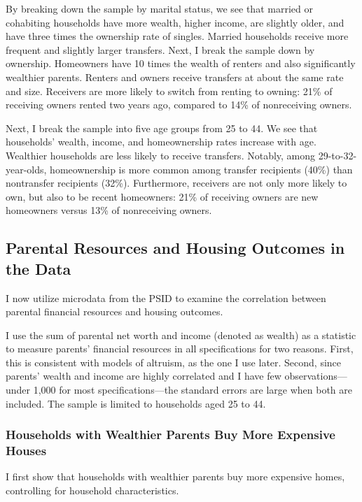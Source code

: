 \documentclass[12pt]{article}
\begin{document}
By breaking down the sample by marital status, we see that married or cohabiting households have more wealth, higher income, are slightly older, and have three times the ownership rate of singles. Married households receive more frequent and slightly larger transfers. Next, I break the sample down by ownership. Homeowners have 10 times the wealth of renters and also significantly wealthier parents. Renters and owners receive transfers at about the same rate and size. Receivers are more likely to switch from renting to owning: 21\% of receiving owners rented two years ago, compared to 14\% of nonreceiving owners.

Next, I break the sample into five age groups from 25 to 44. We see that households' wealth, income, and homeownership rates increase with age. Wealthier households are less likely to receive transfers. Notably, among 29-to-32-year-olds, homeownership is more common among transfer recipients (40\%) than nontransfer recipients (32\%). Furthermore, receivers are not only more likely to own, but also to be recent homeowners: 21\% of receiving owners are new homeowners versus 13\% of nonreceiving owners.



\subsection{Parental Resources and Housing Outcomes in the Data}\label{sec:dataregr}

I now utilize microdata from the PSID to examine the correlation between parental financial resources and housing outcomes.

I use the sum of parental net worth and income (denoted as wealth) as a statistic to measure parents' financial resources in all specifications for two reasons. First, this is consistent with models of altruism, as the one I use later. Second, since parents' wealth and income are highly correlated and I have few observations---under 1,000 for most specifications---the standard errors are large when both are included. The sample is limited to households aged 25 to 44. 

\subsubsection{Households with Wealthier Parents Buy More Expensive Houses}
I first show that households with wealthier parents buy more expensive homes, controlling for household characteristics.
\end{document}
